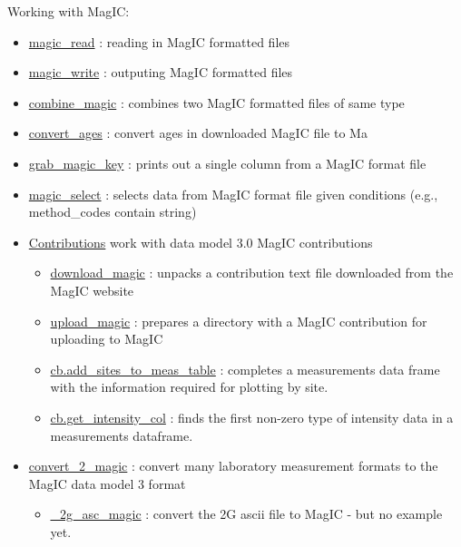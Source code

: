 \documentclass[11pt]{book}
\begin{document}
{{Working with MagIC:
\begin{itemize}
\item \href{http://pmagpy.github.io/PmagPy.html#magic_read}{magic\_read} : reading in MagIC formatted files
\item \href{http://pmagpy.github.io/PmagPy.html#magic_write}{magic\_write} : outputing MagIC formatted files
\item \href{http://pmagpy.github.io/PmagPy.html#combine_magic}{combine\_magic} : combines two MagIC formatted files of same type
\item \href{http://pmagpy.github.io/PmagPy.html#convert_ages}{convert\_ages} : convert ages in downloaded MagIC file to Ma
\item \href{http://pmagpy.github.io/PmagPy.html#grab_magic_key}{grab\_magic\_key} : prints out a single column from a MagIC format file
\item \href{http://pmagpy.github.io/PmagPy.html#magic_select}{magic\_select} : selects data from MagIC format file given conditions (e.g., method\_codes contain string)
\item \href{http://pmagpy.github.io/PmagPy.html#Contributions}{Contributions} work with data model 3.0 MagIC contributions
  \begin{itemize}
\item \href{http://pmagpy.github.io/PmagPy.html#download_magic}{download\_magic} : unpacks a contribution text file downloaded from the MagIC website
\item \href{http://pmagpy.github.io/PmagPy.html#upload_magic}{upload\_magic} : prepares a directory with a MagIC contribution for uploading to MagIC
\item \href{http://pmagpy.github.io/PmagPy.html#cb.add_sites_to_meas_table}{cb.add\_sites\_to\_meas\_table} : completes a measurements data frame with the information required for plotting by site.
\item \href{http://pmagpy.github.io/PmagPy.html#cb.get_intensity_col}{cb.get\_intensity\_col} : finds the first non-zero type of intensity data in a measurements dataframe.
  \end{itemize}
\item \href{http://pmagpy.github.io/PmagPy.html#convert_2_magic}{convert\_2\_magic} : convert many laboratory measurement formats to the MagIC data model 3 format
  \begin{itemize}
\item \href{http://pmagpy.github.io/PmagPy.html#_2g_asc_magic}{\_2g\_asc\_magic} : convert the 2G ascii file to MagIC - but no example yet.

\end{itemize}
\end{itemize}}}
\end{document}
